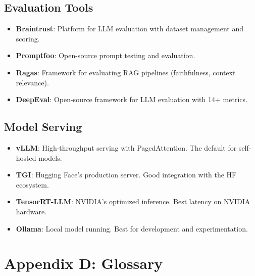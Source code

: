 \subsection{Evaluation Tools}

\begin{itemize}[leftmargin=*]
    \item \textbf{Braintrust}: Platform for LLM evaluation with dataset management and scoring.
    \item \textbf{Promptfoo}: Open-source prompt testing and evaluation.
    \item \textbf{Ragas}: Framework for evaluating RAG pipelines (faithfulness, context relevance).
    \item \textbf{DeepEval}: Open-source framework for LLM evaluation with 14+ metrics.
\end{itemize}

\subsection{Model Serving}

\begin{itemize}[leftmargin=*]
    \item \textbf{vLLM}: High-throughput serving with PagedAttention. The default for self-hosted models.
    \item \textbf{TGI}: Hugging Face's production server. Good integration with the HF ecosystem.
    \item \textbf{TensorRT-LLM}: NVIDIA's optimized inference. Best latency on NVIDIA hardware.
    \item \textbf{Ollama}: Local model running. Best for development and experimentation.
\end{itemize}


\section{Appendix D: Glossary}

